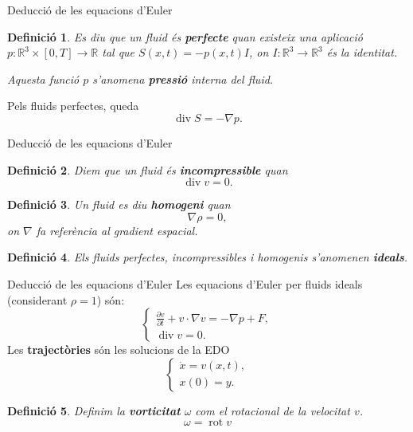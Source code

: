 \documentclass{beamer}
\DeclareMathOperator{\diver}{div}
\DeclareMathOperator{\rot}{rot}
\newtheorem{definicio}{Definici\'{o}}
\begin{document}
\begin{frame}{Deducci\'{o} de les equacions d'Euler}
\begin{definicio}
Es diu que un fluid \'{e}s \textbf{perfecte} quan existeix una aplicaci\'{o} $p:\mathbb{R}^3\times[0,T]\rightarrow\mathbb{R}$ tal que $S(x,t)=-p(x,t)I$, on $I:\mathbb{R}^3\rightarrow\mathbb{R}^3$ \'{e}s la identitat.

Aquesta funci\'{o} $p$ s'anomena \textbf{pressi\'{o}} interna del fluid.
\end{definicio}
\pause
Pels fluids perfectes, queda
\[\diver S=-\nabla p.\]
\end{frame}

\begin{frame}{Deducci\'{o} de les equacions d'Euler}
\begin{definicio}
Diem que un fluid \'{e}s \textbf{incompressible} quan
\[\diver v=0.\]
\end{definicio}
\pause
\begin{definicio}
Un fluid es diu \textbf{homogeni} quan
\[\nabla\rho=0,\]
on $\nabla$ fa refer\`{e}ncia al gradient espacial.
\end{definicio}
\pause
\begin{definicio}
Els fluids perfectes, incompressibles i homogenis s'anomenen \textbf{ideals}.
\end{definicio}
\end{frame}

\begin{frame}{Deducci\'{o} de les equacions d'Euler}
Les equacions d'Euler per fluids ideals (considerant $\rho=1$) s\'{o}n:
\[\left\{\begin{array}{l}\displaystyle{\frac{\partial v}{\partial t}+v\cdot\nabla v=-\nabla p+F,}\\\diver v=0.\end{array}\right.\]
\pause
Les \textbf{traject\`{o}ries} s\'{o}n les solucions de la EDO
\[\left\{\begin{array}{l}\dot{x}=v(x,t),\\x(0)=y.\end{array}\right.\]
\pause
\begin{definicio}
Definim la \textbf{vorticitat} $\omega$ com el rotacional de la velocitat $v$.
\[\omega=\rot v\]
\end{definicio}
\end{frame}
\end{document}
